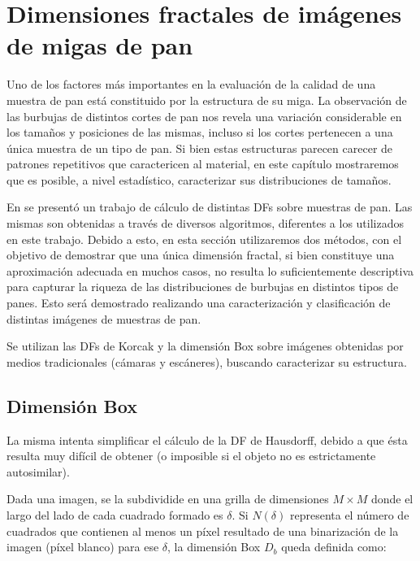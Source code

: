 \section{Dimensiones fractales de imágenes de migas de pan}

Uno de los factores más importantes en la evaluación de la calidad de una muestra de pan está constituido por la estructura de su miga.
La observación de las burbujas de distintos cortes de pan nos revela una variación considerable en los tamaños y posiciones de las mismas, incluso si los cortes pertenecen a una única muestra de un tipo de pan.
Si bien estas estructuras parecen carecer de patrones repetitivos que caractericen al material, en este capítulo mostraremos que es posible, a nivel estadístico, caracterizar sus distribuciones de tamaños.

En \cite{Gonzales2008} se present\'o un trabajo de c\'alculo de distintas DFs sobre muestras de pan.
Las mismas son obtenidas a trav\'es de diversos algoritmos, diferentes a los utilizados en este trabajo.
Debido a esto, en esta sección utilizaremos dos métodos, con el objetivo de demostrar que una única dimensión fractal, si bien constituye una aproximación adecuada en muchos casos, no resulta lo suficientemente descriptiva para capturar la riqueza de las distribuciones de burbujas en distintos tipos de panes.
Esto será demostrado realizando una caracterización y clasificación de distintas imágenes de muestras de pan. 

Se utilizan las DFs de Korcak \cite{Mandelbrot1983} y la dimensi\'on Box \cite{Peitgen2004} sobre imágenes obtenidas por medios tradicionales (cámaras y escáneres), buscando caracterizar su estructura.


\subsection{Dimensi\'on Box}
La misma intenta simplificar el c\'alculo de la DF de Hausdorff, debido a que \'esta resulta muy dif\'icil de obtener \cite{Peitgen2004} (o imposible si el objeto no es estrictamente autosimilar).

Dada una imagen, se la subdividide en una grilla de dimensiones $M\times M$ donde el largo del lado de cada cuadrado formado es $\delta$. Si $N(\delta)$ representa el n\'umero de cuadrados que contienen al menos un p\'ixel resultado de una binarizaci\'on de la imagen (p\'ixel blanco) para ese $\delta$, la dimensi\'on Box $D_{b}$ queda definida como:\\

